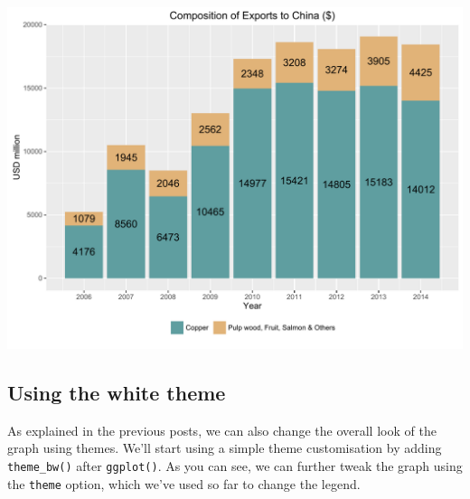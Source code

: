 \documentclass[]{article}
\begin{document}
\begin{center}\includegraphics{0_all_posts_pdf/bar_8-1} \end{center}

\subsection{Using the white theme}\label{using-the-white-theme-2}

As explained in the previous posts, we can also change the overall look
of the graph using themes. We'll start using a simple theme
customisation by adding \texttt{theme\_bw()} after \texttt{ggplot()}. As
you can see, we can further tweak the graph using the \texttt{theme}
option, which we've used so far to change the legend.
\end{document}
